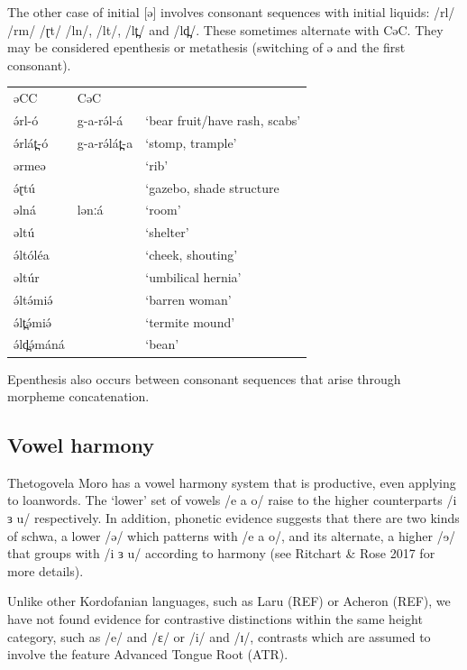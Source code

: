 The other case of initial [ə] involves consonant sequences with initial liquids: /rl/ /rm/ /ɽt/ /ln/, /lt/, /lt̪/ and /ld̪/. These sometimes alternate with CəC. They may be considered epenthesis or metathesis (switching of ə and the first consonant). 

\ea
\begin{tabular}[t]{lll}
əCC	&	CəC\\
ə́rl-ó	&	g-a-rə́l-á	&	‘bear fruit/have rash, scabs’\\
ə́rlát̪-ó	&	g-a-rə́lát̪-a	&	‘stomp, trample’\\
ərmeə	&				&	‘rib’\\
ə́ɽtú		&				&	‘gazebo, shade structure\\
əlná	&	lənːá		&	‘room’\\
əltú		&				&	‘shelter’\\
ə́ltóléa		&				&	‘cheek, shouting’\\
əltúr		&				&	‘umbilical hernia’\\
ə́ltə́miə́		&				&	‘barren woman’\\
ə́lt̪ə́miə́		&				&	‘termite mound’\\
ə́ld̪ə́máná		&				&	‘bean’\\
\end{tabular}
\z

Epenthesis also occurs between consonant sequences that arise through morpheme concatenation.


\subsection{Vowel harmony}\label{section:vharmony}
Thetogovela Moro has a vowel harmony system that is productive, even applying to loanwords. The ‘lower’ set of vowels /e a o/ raise to the higher counterparts /i ɜ u/ respectively. In addition, phonetic evidence suggests that there are two kinds of schwa, a lower /ə/ which patterns with /e a o/, and its alternate, a higher /ɘ/ that groups with /i ɜ u/ according to harmony (see Ritchart \& Rose 2017 for more details).

Unlike other Kordofanian languages, such as Laru (REF) or Acheron (REF), we have not found evidence for  contrastive distinctions within the same height category, such as /e/ and /ɛ/ or /i/ and /ɪ/, contrasts which are assumed to involve the feature Advanced Tongue Root (ATR).

